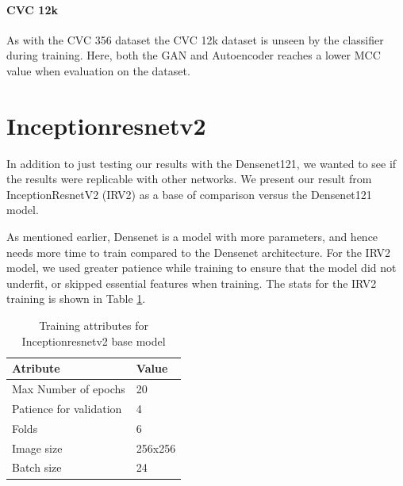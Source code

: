 \paragraph{CVC 12k}
As with the CVC 356 dataset the CVC 12k dataset is unseen by the classifier during training. 
Here, both the GAN and Autoencoder reaches a lower MCC value when evaluation on the dataset. 



































\FloatBarrier

\section{Inceptionresnetv2}
In addition to just testing our results with the Densenet121, we wanted to see if the results were replicable with other networks. We present our result from InceptionResnetV2 (IRV2) as a base of comparison versus the Densenet121 model. 


As mentioned earlier, Densenet is a model with more parameters, and hence needs more time to train compared to the Densenet architecture. 
For the IRV2 model, we used greater patience while training to ensure that the model did not underfit, or skipped essential features when training.
The stats for the IRV2 training is shown in Table \ref{tab:TrainingAttrIRV2}.



\begin{table}
\caption{Training attributes for Inceptionresnetv2 base model }
\begin{center}
\begin{tabular}{ll}
\toprule
Atribute                & Value   \\
\midrule
Max Number of epochs    & 20      \\
Patience for validation & 4       \\
Folds                   & 6       \\
Image size              & 256x256 \\
Batch size              & 24      \\   
\bottomrule
\end{tabular}
\end{center}
\label{tab:TrainingAttrIRV2}
\end{table}

